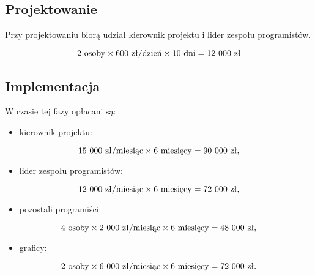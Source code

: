 \documentclass [11pt, a4paper, leqno] {article}
\begin{document}
\subsection{Projektowanie}
Przy projektowaniu biorą udział kierownik projektu i lider zespołu programistów.

\begin{equation}2 \text{ osoby} \times 600 \text{ zł/dzień} \times 10 \text{ dni} = 12\\\ 000 \text{ zł} \end{equation}

\subsection{Implementacja}
\noindent
W czasie tej fazy opłacani są:
\begin{itemize}
\item kierownik projektu: 
\end{itemize}
\begin{equation}15\\\ 000 \text{ zł/miesiąc} \times 6 \text{ miesięcy} = 90\\\ 000 \text{ zł,} \end{equation}

\begin{itemize}
\item lider zespołu programistów: 
\end{itemize}
\begin{equation}12\\\ 000 \text{ zł/miesiąc} \times 6 \text{ miesięcy} = 72\\\ 000 \text{ zł,} \end{equation}

\begin{itemize}
\item pozostali programiści: 
\end{itemize}
\begin{equation}4 \text{ osoby} \times 2\\\ 000 \text{ zł/miesiąc} \times 6 \text{ miesięcy} = 48\\\ 000 \text{ zł,} \end{equation}

\begin{itemize}
\item graficy: 
\end{itemize}
\begin{equation}2 \text{ osoby} \times 6\\\ 000 \text{ zł/miesiąc} \times 6 \text{ miesięcy} = 72\\\ 000 \text{ zł.} \end{equation}
\end{document}
